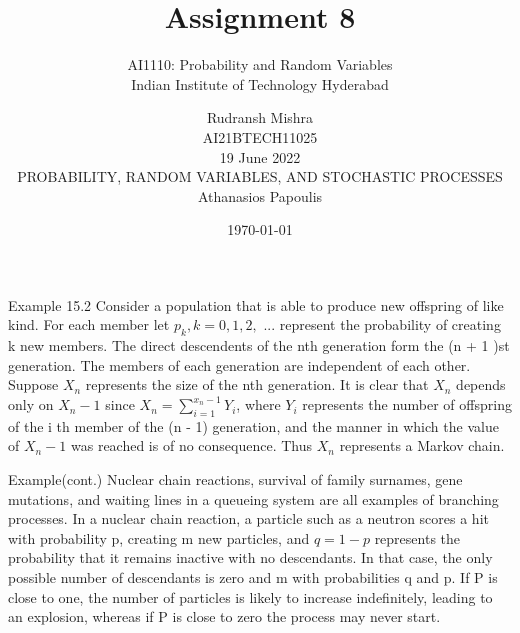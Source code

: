 \documentclass{beamer}
\title{Assignment 8}
\subtitle{\Large AI1110: Probability and Random Variables \\ \large Indian Institute of Technology Hyderabad}
\author{Rudransh Mishra \\ \normalsize AI21BTECH11025 \\ \vspace*{20pt} \normalsize  19 June 2022 \\ \vspace*{20pt} PROBABILITY, RANDOM VARIABLES, AND STOCHASTIC PROCESSES\\ \normalsize Athanasios Papoulis}
\date{\today}
\begin{document}
\begin{frame}
    \titlepage 
\end{frame}

\logo{}


\begin{frame}{Example 15.2}
Consider a population that is able to produce new offspring of like kind. For each member let $p_k, k = 0, 1, 2,$ ... represent the probability of creating k new members. The direct descendents of the nth generation form the (n + 1 )st generation. The members of each generation are independent of each other. Suppose $X_n$ represents the size of the nth generation. It is clear that $X_n$ depends only on $X_n-1$ since $X_n = \sum_{i=1}^{x_n-1}Y_i$, where $Y_i$ represents the number of offspring of the i th member of the (n - 1) generation, and the manner in which the value of $X_n-1$ was reached is of no consequence. Thus $X_n$ represents a Markov chain.
\end{frame}

\begin{frame}{Example(cont.)}
Nuclear chain reactions, survival of family surnames, gene mutations, and waiting lines in a queueing system are all examples of branching processes. In a nuclear chain reaction, a particle such as a neutron scores a hit with probability p, creating m new particles, and $q = 1-p$ represents the probability that it remains inactive with no descendants. In that case, the only possible number of descendants is zero and m with probabilities q and p. If P is close to one, the number of particles is likely to increase indefinitely, leading to an explosion, whereas if P is close to zero the process may never start.
\end{frame}
\end{document}
